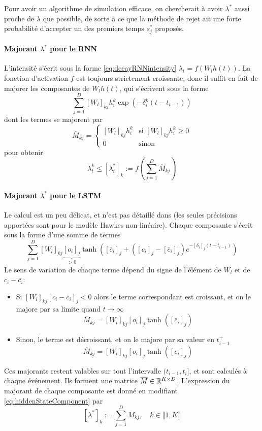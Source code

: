 \documentclass[../main.tex]{subfiles}
\begin{document}
Pour avoir un algorithme de simulation efficace, on chercherait à avoir $\lambda^*$ aussi proche de $\lambda$ que possible, de sorte à ce que la méthode de rejet ait une forte probabilité d'accepter un des premiers temps $s_j^*$ proposés.\footnotemark


\paragraph{Majorant $\lambda^*$ pour le RNN} L'intensité s'écrit sous la forme \eqref{eq:decayRNNintensity} $\lambda_t = f(W_lh(t))$. La fonction d'activation $f$ est toujours strictement croissante, donc il suffit en fait de majorer les composantes de $W_lh(t)$, qui s'écrivent sous la forme
\[
	\sum_{j=1}^D {[W_l]}_{kj}h^k_{i}\exp(-\delta^k_i(t-t_{i-1}))
\]
dont les termes se majorent par
\[
	\overline{M}_{kj} = \begin{cases}
	{[W_l]}_{kj}h^k_i &\mbox{si }{[W_l]}_{kj}h^k_i \geq 0 \\
	0 &\mbox{sinon}
	\end{cases}
\]
pour obtenir
\[
	\lambda_t^k \leq {[\lambda_i^*]}_k := f\left(\sum_{j=1}^D \overline{M}_{kj}\right)
\]

\paragraph{Majorant $\lambda^*$ pour le LSTM} Le calcul est un peu délicat, et n'est pas détaillé dans \autocite{meiEisnerNeuralHawkes} (les seules précisions apportées sont pour le modèle Hawkes non-linéaire).
Chaque composante s'écrit sous la forme d'une somme de termes
\begin{equation}\label{eq:hiddenStateComponent}
	\sum_{j=1}^{D} {[W_l]}_{kj} \underbrace{{[o_i]}_j}_{>0}
	\tanh \left( [\bar{c}_{i}]_j + \left([c_{i}]_j - [\bar{c}_{i}]_j \right)e^{-[\delta_i]_j (t-t_{i-1})}
	\right)
\end{equation}
Le sens de variation de chaque terme dépend du signe de l'élément de $W_l$ et de $c_i - \bar{c_i}$:
\begin{itemize}
	\item Si ${[W_l]}_{kj}{[c_i - \bar{c}_i]}_{j} < 0$ alors le terme correspondant est croissant, et on le majore par sa limite quand $t\to\infty$
	\[
		\overline{M}_{kj} = {[W_l]}_{kj} {[o_i]}_j \tanh \left( [\bar{c}_{i}]_j\right)
	\]
	\item Sinon, le terme est décroissant, et on le majore par sa valeur en $t_{i-1}^{+}$
	\[
		\overline{M}_{kj} = {[W_l]}_{kj} {[o_i]}_j \tanh \left( [c_{i}]_j\right)
	\]
\end{itemize}
Ces majorants restent valables sur tout l'intervalle $(t_{i-1}, t_i]$, et sont calculés à chaque événement. Ils forment une matrice $\overline{M}\in\mathbb{R}^{K\times D}$. L'expression du majorant de chaque composante est donné en modifiant \eqref{eq:hiddenStateComponent} par
\[
	{[\lambda^{*}]}_k := \sum_{j=1}^{D} \overline{M}_{kj},\quad k\in \llbracket 1, K\rrbracket
\]
\end{document}
